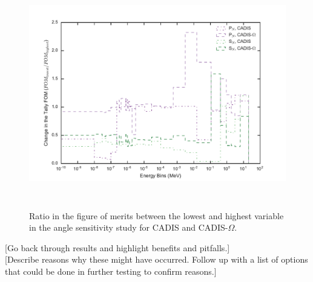 \begin{figure}[h!]
  \centering
  \includegraphics[height=10cm]{./chapters/characterization_probs/figures/angle/prob_1/improvement_fom_allmethds.pdf}
  \caption[Ratio in the figure of merits between the lowest and highest variable in the angle
  sensitivity study for CADIS and CADIS-$\Omega$.]{Ratio in the figure of merits between
    the lowest and highest variable in the angle sensitivity study for CADIS and CADIS-$\Omega$.}
  \label{fig:angle_fom_improvements}
\end{figure}

[Go back through results and highlight benefits and pitfalls.] \\

[Describe reasons why these might have occurred. Follow up with a list of options
that could be done in further testing to confirm reasons.] \\
